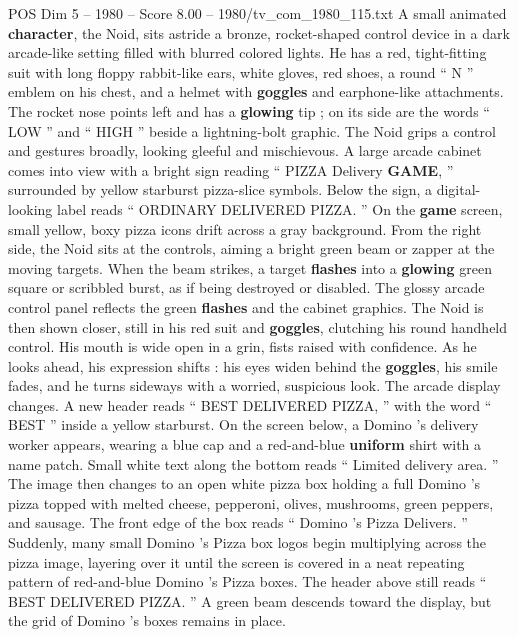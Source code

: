 \begin{textsample}{POS Dim 5 – 1980 – Score 8.00 – 1980/tv\_com\_1980\_115.txt}  \label{ex:f5_pos_031}
A small animated \textbf{character}, the Noid, sits astride a bronze, rocket-shaped control device in a dark arcade-like setting filled with blurred colored lights.
He has a red, tight-fitting suit with long floppy rabbit-like ears, white gloves, red shoes, a round “ N ” emblem on his chest, and a helmet with \textbf{goggles} and earphone-like attachments.
The rocket nose points left and has a \textbf{glowing} tip ; on its side are the words “ LOW ” and “ HIGH ” beside a lightning-bolt graphic.
The Noid grips a control and gestures broadly, looking gleeful and mischievous.
A large arcade cabinet comes into view with a bright sign reading “ PIZZA Delivery \textbf{GAME}, ” surrounded by yellow starburst pizza-slice symbols.
Below the sign, a digital-looking label reads “ ORDINARY DELIVERED PIZZA. ” On the \textbf{game} screen, small yellow, boxy pizza icons drift across a gray background.
From the right side, the Noid sits at the controls, aiming a bright green beam or zapper at the moving targets.
When the beam strikes, a target \textbf{flashes} into a \textbf{glowing} green square or scribbled burst, as if being destroyed or disabled.
The glossy arcade control panel reflects the green \textbf{flashes} and the cabinet graphics.
The Noid is then shown closer, still in his red suit and \textbf{goggles}, clutching his round handheld control.
His mouth is wide open in a grin, fists raised with confidence.
As he looks ahead, his expression shifts : his eyes widen behind the \textbf{goggles}, his smile fades, and he turns sideways with a worried, suspicious look.
The arcade display changes.
A new header reads “ BEST DELIVERED PIZZA, ” with the word “ BEST ” inside a yellow starburst.
On the screen below, a Domino ’s delivery worker appears, wearing a blue cap and a red-and-blue \textbf{uniform} shirt with a name patch.
Small white text along the bottom reads “ Limited delivery area. ” The image then changes to an open white pizza box holding a full Domino ’s pizza topped with melted cheese, pepperoni, olives, mushrooms, green peppers, and sausage.
The front edge of the box reads “ Domino ’s Pizza Delivers. ” Suddenly, many small Domino ’s Pizza box logos begin multiplying across the pizza image, layering over it until the screen is covered in a neat repeating pattern of red-and-blue Domino ’s Pizza boxes.
The header above still reads “ BEST DELIVERED PIZZA. ” A green beam descends toward the display, but the grid of Domino ’s boxes remains in place.

\end{textsample}
